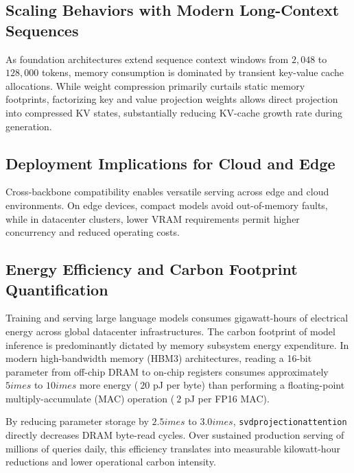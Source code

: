 \subsection{Scaling Behaviors with Modern Long-Context Sequences}
As foundation architectures extend sequence context windows from $2{,}048$ to $128{,}000$ tokens, memory consumption is dominated by transient key-value cache allocations. While weight compression primarily curtails static memory footprints, factorizing key and value projection weights allows direct projection into compressed KV states, substantially reducing KV-cache growth rate during generation.

\subsection{Deployment Implications for Cloud and Edge}
Cross-backbone compatibility enables versatile serving across edge and cloud environments. On edge devices, compact models avoid out-of-memory faults, while in datacenter clusters, lower VRAM requirements permit higher concurrency and reduced operating costs.

\subsection{Energy Efficiency and Carbon Footprint Quantification}
Training and serving large language models consumes gigawatt-hours of electrical energy across global datacenter infrastructures. The carbon footprint of model inference is predominantly dictated by memory subsystem energy expenditure. In modern high-bandwidth memory (HBM3) architectures, reading a 16-bit parameter from off-chip DRAM to on-chip registers consumes approximately $5	imes$ to $10	imes$ more energy ($~20$ pJ per byte) than performing a floating-point multiply-accumulate (MAC) operation ($~2$ pJ per FP16 MAC).

By reducing parameter storage by $2.5	imes$ to $3.0	imes$, \texttt{svdprojectionattention} directly decreases DRAM byte-read cycles. Over sustained production serving of millions of queries daily, this efficiency translates into measurable kilowatt-hour reductions and lower operational carbon intensity.
